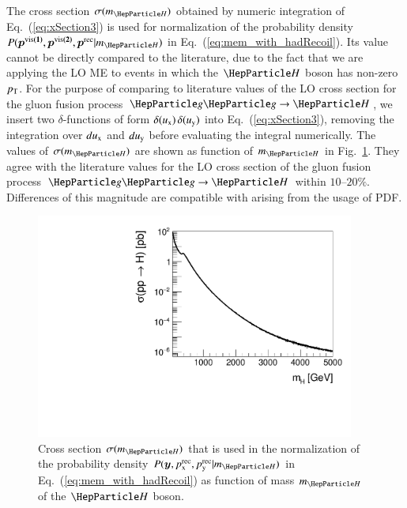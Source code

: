 The cross section $\sigma(m_{\PHiggs})$ obtained by numeric
integration of Eq.~(\ref{eq:xSection3}) is used for normalization 
of the probability density $P(\bm{p^{\vis(1)}},\bm{p^{\vis(2)}},\bm{p^{\rec}}|m_{\PHiggs})$ in Eq.~(\ref{eq:mem_with_hadRecoil}).
Its value cannot be directly compared to the literature,
due to the fact that we are applying the LO ME to events in which the $\PHiggs$ boson has non-zero $p_{\textrm{T}}$.
For the purpose of comparing to literature values of the LO cross section for the gluon fusion process $\Pg\Pg \to \PHiggs$,
we insert two $\delta$-functions of form $\delta(u_{\textrm{x}}) \, \delta(u_{\textrm{y}})$ into Eq.~(\ref{eq:xSection3}),
\ie removing the integration over $du_{\textrm{x}}$ and $du_{\textrm{y}}$ before evaluating
the integral numerically.
The values of $\sigma(m_{\PHiggs})$ are shown as function of
$m_{\PHiggs}$ in Fig.~\ref{fig:xSection}.
They agree with the literature values for the LO cross section of the
gluon fusion process $\Pg\Pg \to \PHiggs$ within $10$--$20\%$. 
Differences of this magnitude are compatible with arising from the
usage of PDF.

\begin{figure}
\begin{center}
\includegraphics*[height=74mm]{figures/makeSVfitMEM_xSectionPlot_log.pdf}
\end{center}
\caption{
  Cross section $\sigma(m_{\PHiggs})$ 
  that is used in the normalization of the probability density $P(\bm{y},\pX^{\rec},\pY^{\rec}|m_{\PHiggs})$ in Eq.~(\ref{eq:mem_with_hadRecoil})
  as function of mass $m_{\PHiggs}$ of the $\PHiggs$ boson.
}
\label{fig:xSection}
\end{figure}


